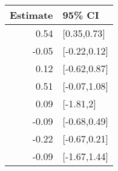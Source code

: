 \begin{tabular}{rl}
  \hline
Estimate & 95\% CI \\ 
  \hline
0.54 & [0.35,0.73] \\ 
  -0.05 & [-0.22,0.12] \\ 
  0.12 & [-0.62,0.87] \\ 
  0.51 & [-0.07,1.08] \\ 
  0.09 & [-1.81,2] \\ 
  -0.09 & [-0.68,0.49] \\ 
  -0.22 & [-0.67,0.21] \\ 
  -0.09 & [-1.67,1.44] \\ 
   \hline
\end{tabular}

